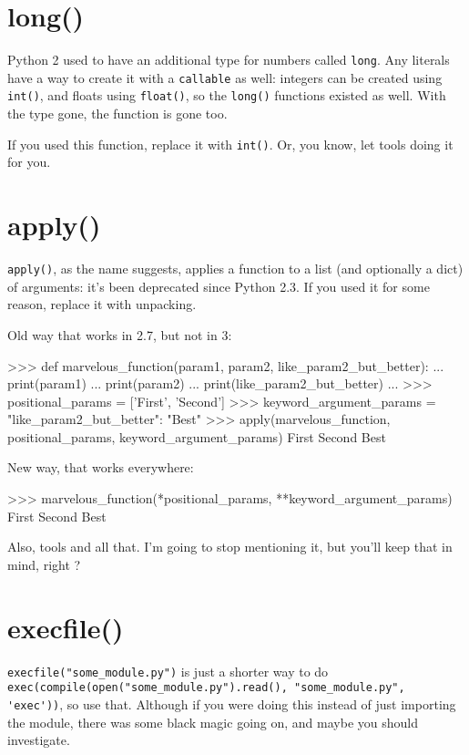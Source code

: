 \section{long()}

Python 2 used to have an additional type for numbers called \lstinline{long}. Any \glspl{literal} have a way to create it with a \lstinline{callable} as well: integers can be created using \lstinline{int()}, and floats using \lstinline{float()}, so the \lstinline{long()} functions existed as well. With the type gone, the function is gone too.

If you used this function, replace it with \lstinline{int()}. Or, you know, let tools doing it for you.

\section{apply()}

\lstinline{apply()}, as the name suggests, applies a function to a list (and optionally a dict) of arguments: it's been deprecated since Python 2.3. If you used it for some reason, replace it with unpacking.

Old way that works in 2.7, but not in 3:

\begin{py2}
>>> def marvelous_function(param1, param2, like_param2_but_better):
...    print(param1)
...    print(param2)
...    print(like_param2_but_better)
...
>>> positional_params = ['First', 'Second']
>>> keyword_argument_params = {"like_param2_but_better": "Best"}
>>> apply(marvelous_function, positional_params, keyword_argument_params)
First
Second
Best
\end{py2}

New way, that works everywhere:

\begin{py2and3}
>>> marvelous_function(*positional_params, **keyword_argument_params)
First
Second
Best
\end{py2and3}

Also, tools and all that. I'm going to stop mentioning it, but you'll keep that in mind, right ?

\section{execfile()}

\lstinline{execfile("some_module.py")} is just a shorter way to do \lstinline{exec(compile(open("some_module.py").read(), "some_module.py", 'exec'))}, so use that. Although if you were doing this instead of just importing the module, there was some black magic going on, and maybe you should investigate.


